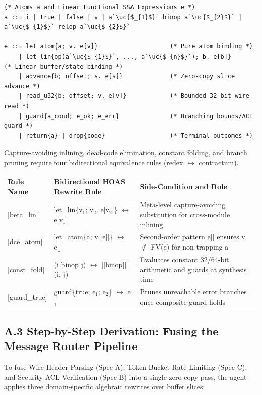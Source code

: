 \begin{lstlisting}
(* Atoms a and Linear Functional SSA Expressions e *)
a ::= i | true | false | v | a`\uc{$_{1}$}` binop a`\uc{$_{2}$}` | a`\uc{$_{1}$}` relop a`\uc{$_{2}$}`

e ::= let_atom{a; v. e[v]}                    (* Pure atom binding *)
    | let_lin{op(a`\uc{$_{1}$}`, ..., a`\uc{$_{n}$}`); b. e[b]}       (* Linear buffer/state binding *)
    | advance{b; offset; s. e[s]}             (* Zero-copy slice advance *)
    | read_u32{b; offset; v. e[v]}            (* Bounded 32-bit wire read *)
    | guard{a_cond; e_ok; e_err}              (* Branching bounds/ACL guard *)
    | return{a} | drop{code}                  (* Terminal outcomes *)
\end{lstlisting}
Capture-avoiding inlining, dead-code elimination, constant folding, and branch pruning require four bidirectional equivalence rules (redex \ensuremath{\leftrightarrow} contractum).


\begin{center}\small
\begin{tabularx}{\linewidth}{@{}LLL@{}}
\toprule
\textbf{Rule Name} & \textbf{Bidirectional HOAS Rewrite Rule} & \textbf{Side-Condition and Role} \tabularnewline
\midrule
{}[beta\_lin] & let\_lin\{v\ensuremath{_{1}}; v\ensuremath{_{2}}. e[v\ensuremath{_{2}}]\} \ensuremath{\leftrightarrow} e[v\ensuremath{_{1}}] & Meta-level capture-avoiding substitution for cross-module inlining \tabularnewline
{}[dce\_atom] & let\_atom\{a; v. e[]\} \ensuremath{\leftrightarrow} e[] & Second-order pattern e[] ensures v \ensuremath{\notin} FV(e) for non-trapping a \tabularnewline
{}[const\_fold] & (i binop j) \ensuremath{\leftrightarrow} \ensuremath{[\![}binop\ensuremath{]\!]}(i, j) & Evaluates constant 32/64-bit arithmetic and guards at synthesis time \tabularnewline
{}[guard\_true] & guard\{true; e\ensuremath{_{1}}; e\ensuremath{_{2}}\} \ensuremath{\leftrightarrow} e\ensuremath{_{1}} & Prunes unreachable error branches once composite guard holds \tabularnewline
\bottomrule
\end{tabularx}
\end{center}


\subsection*{A.3 Step-by-Step Derivation: Fusing the Message Router Pipeline}
To fuse Wire Header Parsing (Spec A), Token-Bucket Rate Limiting (Spec C), and Security ACL Verification (Spec B) into a single zero-copy pass, the agent applies three domain-specific algebraic rewrites over buffer slices:

